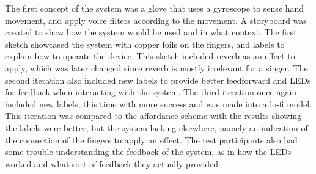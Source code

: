 The first concept of the system was a glove that uses a gyroscope to sense hand movement, and apply voice filters according to the movement. A storyboard was created to show how the system would be used and in what context. The first sketch showcased the system with copper foils on the fingers, and labels to explain how to operate the device. This sketch included reverb as an effect to apply, which was later changed since reverb is mostly irrelevant for a singer. The second iteration also included new labels to provide better feedforward and LEDs for feedback when interacting with the system. The third iteration once again included new labels, this time with more success and was made into a lo-fi model. This iteration was compared to the affordance scheme with the results showing the labels were better, but the system lacking elsewhere, namely an indication of the connection of the fingers to apply an effect. The test participants also had some trouble understanding the feedback of the system, as in how the LEDs worked and what sort of feedback they actually provided.